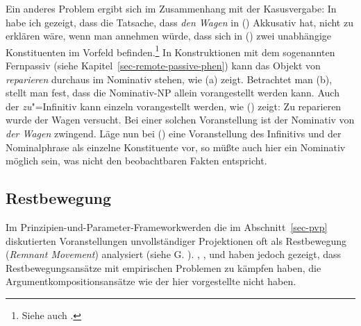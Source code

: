 Ein anderes Problem ergibt sich im Zusammenhang mit der Kasusvergabe:
In  habe ich gezeigt, dass die Tatsache,
dass \emph{den Wagen} in () Akkusativ hat, nicht zu erklären wäre, wenn man annehmen würde,
dass sich in () zwei unabhängige Konstituenten im Vorfeld befinden.\footnote{
  Siehe auch .%
}
\eal 
{}
\zl
In Konstruktionen mit dem sogenannten Fernpassiv (siehe Kapitel~\ref{sec-remote-passive-phen})
kann das Objekt von \emph{reparieren} durchaus im Nominativ stehen, wie (a) zeigt.
Betrachtet man (b), stellt man fest, dass die Nominativ-NP allein vorangestellt werden kann.
\eal
{}
\zl
Auch der \emph{zu}"=Infinitiv kann einzeln vorangestellt werden, wie () zeigt:
\ea
Zu reparieren wurde der Wagen versucht.
\z
Bei einer solchen Voranstellung ist der Nominativ von \emph{der Wagen} zwingend.
Läge nun bei () eine Voranstellung des Infinitivs und der Nominalphrase 
als einzelne Konstituente vor, so müßte auch hier ein Nominativ möglich sein, 
was nicht den beobachtbaren Fakten entspricht.


\subsection{Restbewegung}
\label{sec-restbewegung}

Im Prinzipien-und-Parameter-Framework\indexgb werden die im Abschnitt~\ref{sec-pvp} diskutierten
Voranstellungen unvollständiger Projektionen
oft als Restbewegung (\emph{Remnant Movement}) analysiert (siehe \zb G. \citealp{GMueller96a,GMueller98a}).
\citet[]{Haider93a}, \citet[Kapitel~4.2.5]{deKuthy2002a}, \citet[Abschnitt~2]{dKM2001a} und \citet{Fanselow2002a} haben jedoch gezeigt, 
dass Restbewegungsansätze mit empirischen Problemen zu kämpfen haben, 
die Argumentkompositionsansätze wie der hier vorgestellte nicht haben.%



